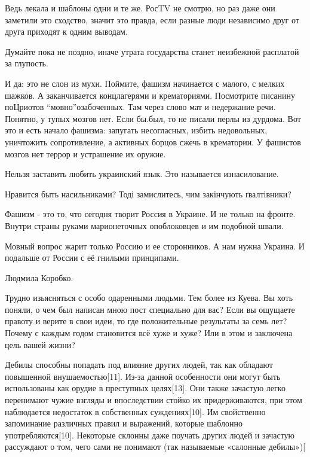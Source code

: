 \begin{itemize}
\begin{itemize}
Ведь лекала и шаблоны одни и те же. РосTV не смотрю, но раз даже они заметили
это сходство, значит это правда, если разные люди независимо друг от друга
приходят к одним выводам.

Думайте пока не поздно, иначе утрата государства станет неизбежной расплатой за глупость.

И да: это не слон из мухи. Поймите, фашизм начинается с малого, с мелких
шажков. А заканчивается концлагерями и крематориями. Посмотрите писанину
поЦриотов \enquote{мовно}озабоченных. Там через слово мат и недержание речи. Понятно, у
тупых мозгов нет. Если бы.был, то не писали перлы из дурдома. Вот это и есть
начало фашизма: запугать несогласных, избить недовольных, уничтожить
сопротивление, а активных борцов сжечь в крематории. У фашистов мозгов нет
террор и устрашение их оружие.


Нельзя заставить любить украинский язык. Это называется изнасилование.

Нравится быть насильниками? Тоді замислитесь, чим закінчують ґвалтівники?



Фашизм - это то, что сегодня творит Россия в Украине. И не только на фронте.
Внутри страны руками марионеточных опоблоковцев и им подобной швали.

Мовный вопрос жарит только Россию и ее сторонников. А нам нужна Украина. И
подальше от России с её гнилыми принципами.

Людмила Коробко.

Трудно изьясняться с особо одаренными людьми. Тем более из Куева. Вы хоть
поняли, о чем был написан мною пост специально для вас? Если вы ощущаете
правоту и верите в свои идеи, то где положительные результаты за семь лет?
Почему с каждым годом становится всё хуже и хуже? Или в этом и заключена цель
вашей жизни?

Дебилы способны попадать под влияние других людей, так как обладают повышенной
внушаемостью[11]. Из-за данной особенности они могут быть использованы как
орудие в преступных целях[13]. Они также зачастую легко перенимают чужие
взгляды и впоследствии стойко их придерживаются, при этом наблюдается
недостаток в собственных суждениях[10]. Им свойственно запоминание различных
правил и выражений, которые шаблонно употребляются[10]. Некоторые склонны даже
поучать других людей и зачастую рассуждают о том, чего сами не понимают (так
называемые «салонные дебилы»)[



\end{itemize}
\end{itemize}
